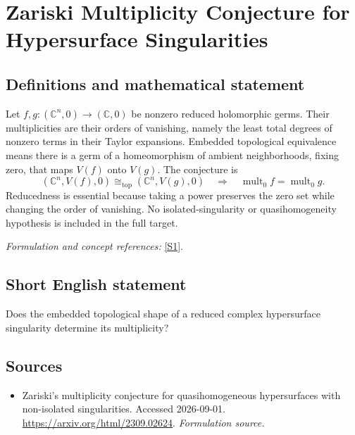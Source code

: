\documentclass[11pt]{article}
\begin{document}
\section*{\texorpdfstring{Zariski Multiplicity Conjecture for Hypersurface Singularities}{Zariski Multiplicity Conjecture for Hypersurface Singularities}}\label{298}
\subsection{Definitions and mathematical statement}
Let $f,g:({\mathbb{C}}^n,0)\to({\mathbb{C}},0)$ be nonzero reduced holomorphic germs. Their multiplicities are their orders of vanishing, namely the least total degrees of nonzero terms in their Taylor expansions. Embedded topological equivalence means there is a germ of a homeomorphism of ambient neighborhoods, fixing zero, that maps $V(f)$ onto $V(g)$. The conjecture is
\[
 ({\mathbb{C}}^n,V(f),0)\cong_{\mathrm{top}}({\mathbb{C}}^n,V(g),0)
 \quad\Longrightarrow\quad\operatorname{mult}_0f=\operatorname{mult}_0g.
\]
Reducedness is essential because taking a power preserves the zero set while changing the order of vanishing. No isolated-singularity or quasihomogeneity hypothesis is included in the full target.
\par\smallskip\textit{Formulation and concept references:} \href{https://arxiv.org/html/2309.02624}{[S1]}.

\subsection{Short English statement}
Does the embedded topological shape of a reduced complex hypersurface singularity determine its multiplicity?
\subsection{Sources}
\begin{itemize}
\item[S1]Zariski's multiplicity conjecture for quasihomogeneous hypersurfaces with non-isolated singularities. Accessed 2026-09-01.
\url{https://arxiv.org/html/2309.02624}.
\textit{Formulation source.}
\end{itemize}
\end{document}
